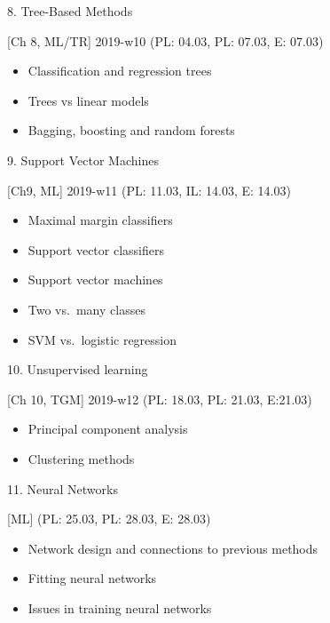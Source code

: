 \documentclass[ignorenonframetext,]{beamer}
\providecommand{\tightlist}{%
  \setlength{\itemsep}{0pt}\setlength{\parskip}{0pt}}
\begin{document}
\begin{frame}

\begin{block}{8. Tree-Based Methods}

{[}Ch 8, ML/TR{]} 2019-w10 (PL: 04.03, PL: 07.03, E: 07.03)

\begin{itemize}
\tightlist
\item
  Classification and regression trees
\item
  Trees vs linear models
\item
  Bagging, boosting and random forests
\end{itemize}

\end{block}

\begin{block}{9. Support Vector Machines}

{[}Ch9, ML{]} 2019-w11 (PL: 11.03, IL: 14.03, E: 14.03)

\begin{itemize}
\tightlist
\item
  Maximal margin classifiers
\item
  Support vector classifiers
\item
  Support vector machines
\item
  Two vs.~many classes
\item
  SVM vs.~logistic regression
\end{itemize}

\end{block}

\end{frame}

\begin{frame}

\begin{block}{10. Unsupervised learning}

{[}Ch 10, TGM{]} 2019-w12 (PL: 18.03, PL: 21.03, E:21.03)

\begin{itemize}
\tightlist
\item
  Principal component analysis
\item
  Clustering methods
\end{itemize}

\end{block}

\begin{block}{11. Neural Networks}

{[}ML{]} (PL: 25.03, PL: 28.03, E: 28.03)

\begin{itemize}
\tightlist
\item
  Network design and connections to previous methods
\item
  Fitting neural networks
\item
  Issues in training neural networks
\end{itemize}

\end{block}

\end{frame}
\end{document}
